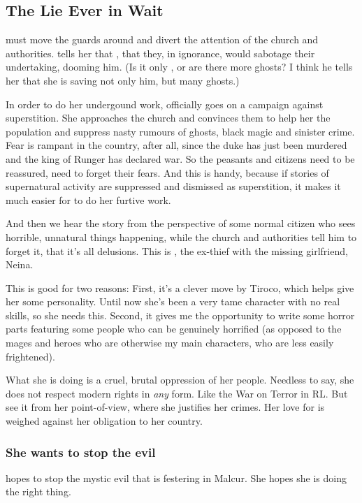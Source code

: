 \begin{garbage}
\subsection{The \Qliphoth{} Lie Ever in Wait}
\Tiroco{} must move the guards around and divert the attention of the church and authorities. \Icor{} tells her that , that they, in ignorance, would sabotage their undertaking, dooming him. (Is it only \Icor{}, or are there more ghosts? I think he tells her that she is saving not only him, but many ghosts.) 

In order to do her undergound work, \Tiroco{} officially goes on a campaign against superstition. She approaches the church and convinces them to help her  the population and suppress nasty rumours of ghosts, black magic and sinister crime. 
Fear is rampant in the country, after all, since the duke has just been murdered and the king of Runger has declared war. So the peasants and citizens need to be reassured, need to forget their fears. 
And this is handy, because if stories of supernatural activity are suppressed and dismissed as superstition, it makes it much easier for \Tiroco{} to do her furtive work. 

And then we hear the story from the perspective of some normal citizen who sees horrible, unnatural things happening, while the church and authorities tell him to forget it, that it's all delusions. This is , the ex-thief with the missing girlfriend, Neina. 

This is good for two reasons: 
First, it's a clever move by Tiroco, which helps give her some personality. Until now she's been a very tame character with no real skills, so she needs this. 
Second, it gives me the opportunity to write some horror parts featuring some  people who can be genuinely horrified (as opposed to the mages and heroes who are otherwise my main characters, who are less easily frightened). 

What she is doing is a cruel, brutal oppression of her people. Needless to say, she does not respect modern \human{} rights in \emph{any} form. Like the War on Terror in RL. But see it from her point-of-view, where she justifies her crimes. Her love for \Icor{} is weighed against her obligation to her country. 





\subsubsection{She wants to stop the evil}
\Tiroco{} hopes to stop the mystic evil that is festering in Malcur. 
She hopes she is doing the right thing. 










\end{garbage}
